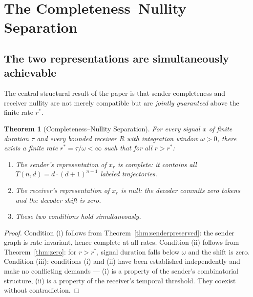 \documentclass[twocolumn,11pt,a4paper]{article}
\theoremstyle{main}
\newtheorem{theorem}{Theorem}[section]
\theoremstyle{definition}
\theoremstyle{remark}
\newcommand{\Recv}{R}
\newcommand{\Traj}{T}
\newcommand{\rate}{r}
\newcommand{\window}{\omega}
\begin{document}
\section{The Completeness--Nullity Separation}
\label{sec:separation}

\subsection{The two representations are simultaneously achievable}

The central structural result of the paper is that sender completeness
and receiver nullity are not merely compatible but are \emph{jointly
guaranteed} above the finite rate $\rate^*$.

\begin{theorem}[Completeness--Nullity Separation]
\label{thm:separation}
For every signal $x$ of finite duration $\tau$ and every bounded
receiver $\Recv$ with integration window $\window > 0$, there exists a
finite rate $\rate^* = \tau / \window < \infty$ such that for all
$\rate > \rate^*$:
\begin{enumerate}[label=(\roman*), leftmargin=1.8em, itemsep=1pt]
\item The sender's representation of $x_\rate$ is complete: it contains
  all $\Traj(n,d) = d \cdot (d+1)^{n-1}$ labeled trajectories.
\item The receiver's representation of $x_\rate$ is null: the decoder
  commits zero tokens and the decoder-shift is zero.
\item These two conditions hold simultaneously.
\end{enumerate}
\end{theorem}

\begin{proof}
Condition (i) follows from Theorem~\ref{thm:senderpreserved}: the sender
graph is rate-invariant, hence complete at all rates. Condition (ii)
follows from Theorem~\ref{thm:zero}: for $\rate > \rate^*$, signal
duration falls below $\window$ and the shift is zero. Condition (iii):
conditions (i) and (ii) have been established independently and make no
conflicting demands --- (i) is a property of the sender's combinatorial
structure, (ii) is a property of the receiver's temporal threshold.
They coexist without contradiction.
\end{proof}
\end{document}
